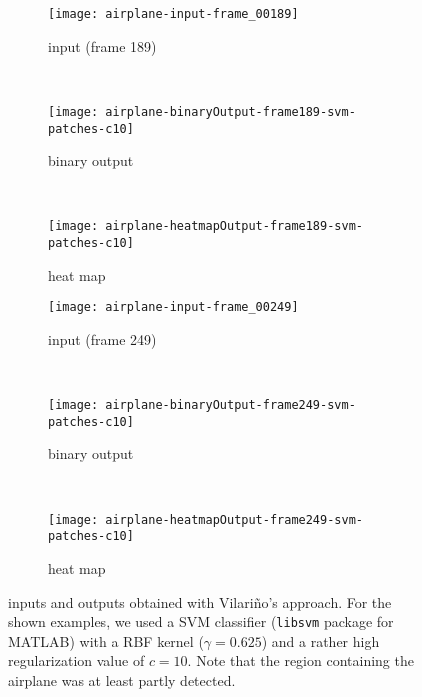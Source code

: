 \begin{figure}[ht]
	\centering
	\begin{subfigure}[h]{0.31\textwidth}
		\texttt{[image: airplane-input-frame\_00189]}	
		\caption*{input (frame 189)}
	\end{subfigure}
	~
	\begin{subfigure}[h]{0.31\textwidth}
		\texttt{[image: airplane-binaryOutput-frame189-svm-patches-c10]}	
		\caption*{binary output}
	\end{subfigure}
	~
	\begin{subfigure}[h]{0.31\textwidth}
		\texttt{[image: airplane-heatmapOutput-frame189-svm-patches-c10]}	
		\caption*{heat map}
	\end{subfigure}
	
	\vspace{3mm}
	\begin{subfigure}[h]{0.31\textwidth}
		\texttt{[image: airplane-input-frame\_00249]}	
		\caption*{input (frame 249)}
	\end{subfigure}
	~
	\begin{subfigure}[h]{0.31\textwidth}
		\texttt{[image: airplane-binaryOutput-frame249-svm-patches-c10]}	
		\caption*{binary output}
	\end{subfigure}	
	~
	\begin{subfigure}[h]{0.31\textwidth}
		\texttt{[image: airplane-heatmapOutput-frame249-svm-patches-c10]}	
		\caption*{heat map}
	\end{subfigure}	
	\caption{inputs and outputs obtained with Vilari\~no's approach. For the shown examples, we used a SVM classifier ({\tt libsvm} package for MATLAB) with a RBF kernel ($\gamma = 0.625$) and a rather high regularization value of $c = 10$. Note that the region containing the airplane was at least partly detected.}
	\label{fig:theirapproachairplane}
\end{figure}

